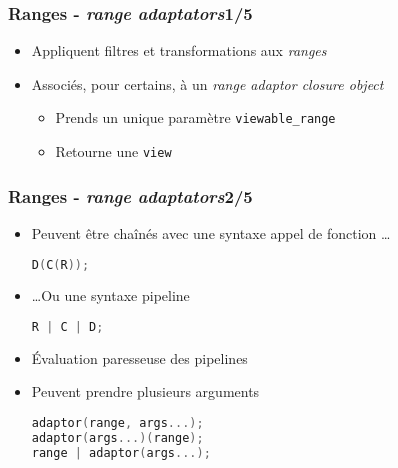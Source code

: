 \documentclass[C++.tex]{subfiles}
\begin{document}
\begin{frame}[fragile]
	\frametitle{Ranges - \textit{range adaptators}\titlehfill{}1/5}
	\begin{itemize}
		\item Appliquent filtres et transformations aux \textit{ranges}
		\item Associés, pour certains, à un \textit{range adaptor closure object}
		\begin{itemize}
			\item Prends un unique paramètre \lstinline|viewable_range|
			\item Retourne une \lstinline|view|
		\end{itemize}
	\end{itemize}
\end{frame}

\begin{frame}[fragile]
	\frametitle{Ranges - \textit{range adaptators}\titlehfill{}2/5}
	\begin{itemize}
		\item Peuvent être chaînés avec une syntaxe \og appel de fonction\fg{} \ldots

		\begin{lstlisting}[language=C++]
D(C(R));\end{lstlisting}
		
		\item \ldots Ou une syntaxe \og pipeline\fg{}

		\begin{lstlisting}[language=C++]
R | C | D;\end{lstlisting}

		\item Évaluation paresseuse des pipelines
		\item Peuvent prendre plusieurs arguments


		\begin{lstlisting}[language=C++]
adaptor(range, args...);
adaptor(args...)(range);
range | adaptor(args...);\end{lstlisting}

	\end{itemize}
\end{frame}
\end{document}
